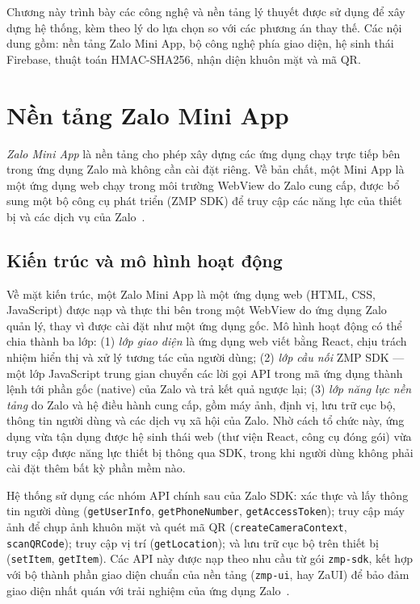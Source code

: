 \documentclass[../main.tex]{subfiles}
\begin{document}
Chương này trình bày các công nghệ và nền tảng lý thuyết được sử dụng để xây dựng hệ
thống, kèm theo lý do lựa chọn so với các phương án thay thế. Các nội dung gồm: nền tảng
Zalo Mini App, bộ công nghệ phía giao diện, hệ sinh thái Firebase, thuật toán HMAC-SHA256,
nhận diện khuôn mặt và mã QR.

\section{Nền tảng Zalo Mini App}
\label{sec:zalo}

\textit{Zalo Mini App} là nền tảng cho phép xây dựng các ứng dụng chạy trực tiếp bên
trong ứng dụng Zalo mà không cần cài đặt riêng. Về bản chất, một Mini App là một ứng
dụng web chạy trong môi trường WebView do Zalo cung cấp, được bổ sung một bộ công cụ
phát triển (ZMP SDK) để truy cập các năng lực của thiết bị và các dịch vụ của Zalo~\cite{zalominiapp}.

\subsection{Kiến trúc và mô hình hoạt động}
\label{sec:zalo-kientruc}

Về mặt kiến trúc, một Zalo Mini App là một ứng dụng web (HTML, CSS, JavaScript) được nạp và
thực thi bên trong một WebView do ứng dụng Zalo quản lý, thay vì được cài đặt như một ứng dụng
gốc. Mô hình hoạt động có thể chia thành ba lớp: (1) \textit{lớp giao diện} là ứng dụng web
viết bằng React, chịu trách nhiệm hiển thị và xử lý tương tác của người dùng; (2) \textit{lớp
cầu nối} ZMP SDK --- một lớp JavaScript trung gian chuyển các lời gọi API trong mã ứng dụng
thành lệnh tới phần gốc (native) của Zalo và trả kết quả ngược lại; (3) \textit{lớp năng lực
nền tảng} do Zalo và hệ điều hành cung cấp, gồm máy ảnh, định vị, lưu trữ cục bộ, thông tin
người dùng và các dịch vụ xã hội của Zalo. Nhờ cách tổ chức này, ứng dụng vừa tận dụng được
hệ sinh thái web (thư viện React, công cụ đóng gói) vừa truy cập được năng lực thiết bị thông
qua SDK, trong khi người dùng không phải cài đặt thêm bất kỳ phần mềm nào.

Hệ thống sử dụng các nhóm API chính sau của Zalo SDK: xác thực và lấy thông tin người
dùng (\texttt{getUserInfo}, \texttt{getPhoneNumber}, \texttt{getAccessToken}); truy cập
máy ảnh để chụp ảnh khuôn mặt và quét mã QR (\texttt{createCameraContext},
\texttt{scanQRCode}); truy cập vị trí (\texttt{getLocation}); và lưu trữ cục bộ trên
thiết bị (\texttt{setItem}, \texttt{getItem}). Các API này được nạp theo nhu cầu từ gói
\texttt{zmp-sdk}, kết hợp với bộ thành phần giao diện chuẩn của nền tảng (\texttt{zmp-ui},
hay ZaUI) để bảo đảm giao diện nhất quán với trải nghiệm của ứng dụng Zalo~\cite{zmpdocs}.
\end{document}
